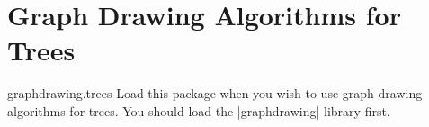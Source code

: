 %
%
%

\section{Graph Drawing Algorithms for Trees}

\begin{tikzlibrary}{graphdrawing.trees}
  Load this package when you wish to use graph drawing algorithms for
  trees. You should load the |graphdrawing| library first.
\end{tikzlibrary}

\ifluatex\relax{}\expandafter\endinput\fi


\begin{key}{/graph drawing/tree=\meta{options}}
  \keyalias{tikz}\keyalias{tikz/graphs}
  Similar to the |>| option, this ``generic'' name for a tree drawing
  algorithm is not hardwired to any specific algorithm. Rather, users
  can select an algorithm somewhere at the beginning of their program
  and then just write |\graph[tree]| to draw a tree.

  The \meta{options} will be forwarded to the currently selected
  algorithm.
\begin{codeexample}[]
\tikz \graph [tree] { a -> {b,c} };    
\end{codeexample}
  
  To change the algorithm, change the following key:
  \begin{key}{/graph drawing/tree/default algorithm=\meta{algorithm}}
    Set this key to the tree drawing algorithm of your choice. The
    default is |AhrensFKSS2011 tree|, but this will change.
  \end{key}
\end{key}


